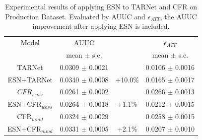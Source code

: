 \documentclass[sigconf]{acmart}
\begin{document}
\begin{table}[h]
    \centering
    \begin{tabular}{cccc}
        \toprule
        Model & AUUC &  & $\epsilon_{ATT}$\\
         & mean $\pm$ s.e. &  & mean $\pm$ s.e.\\
        \midrule
        TARNet & 0.0309 $\pm$ 0.0021 &  & 0.0106 $\pm$ 0.0016\\
        ESN+TARNet & 0.0340 $\pm$ 0.0008 & +10.0\% & 0.0165 $\pm$ 0.0017\\
        \midrule
        $CFR_{wass}$ & 0.0261 $\pm$ 0.0002 &  & 0.0266 $\pm$ 0.0013\\
        ESN+CFR$_{wass}$ & 0.0264 $\pm$ 0.0018 & +1.1\% & 0.0212 $\pm$ 0.0015\\
        \midrule
        CFR$_{mmd}$ & 0.0324 $\pm$ 0.0029 &  & 0.0258 $\pm$ 0.0015\\
        ESN+CFR$_{mmd}$ & 0.0331 $\pm$ 0.0005 & +2.1\% & 0.0207 $\pm$ 0.0010\\
        \bottomrule
    \end{tabular}
    \caption{Experimental results of applying ESN to TARNet and CFR on Production Dataset. Evaluated by AUUC and $\epsilon_{ATT}$, the AUUC improvement after applying ESN is included.}
    \label{tab:ESN result 2}
    \vspace{-0.5cm}
\end{table}
\end{document}
